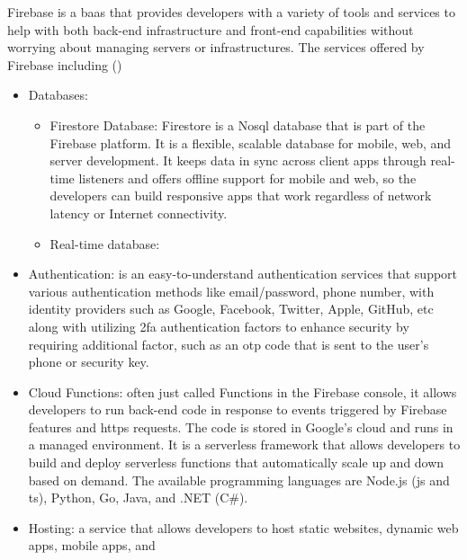 \begin{multicols}{2}
      Firebase is a \acrshort{baas} that provides developers with a variety of tools and services to help with both
      back-end infrastructure and front-end capabilities without worrying about managing servers or infrastructures.
      The services offered by Firebase including (\cite{firebaseproducts})
      \begin{itemize}
            \item Databases:
                  \begin{itemize}
                        \item Firestore Database: Firestore is a No\acrshort{sql} database that is part of the Firebase
                              platform. It is a flexible, scalable database for mobile, web, and server development. It keeps
                              data in sync across client apps through real-time listeners and offers offline support for mobile
                              and web, so the developers can build responsive apps that work regardless of network latency or
                              Internet connectivity.
                        \item Real-time database:
                  \end{itemize}
            \item Authentication: is an easy-to-understand authentication services that support various authentication
                  methods like email/password, phone number, with identity providers such as Google, Facebook, Twitter,
                  Apple, GitHub, \acrshort{etc}
                  along with utilizing \acrshort{2fa} authentication factors to enhance security by requiring additional
                  factor, such as an \acrshort{otp} code that is sent to the user's phone or security key.
            \item Cloud Functions: often just called Functions in the Firebase console, it allows developers to run
                  back-end code in response to events triggered by Firebase features and \acrshort{https} requests.
                  The code is stored in Google's cloud and runs in a managed environment. It is a serverless framework
                  that allows developers to build and deploy serverless functions that automatically scale up and down
                  based on demand. The available programming languages are Node.js (\acrshort{js} and \acrshort{ts}),
                  Python, Go, Java, and .NET (C\#).
            \item Hosting: a service that allows developers to host static websites, dynamic web apps, mobile apps, and

\end{itemize}
\end{multicols}
